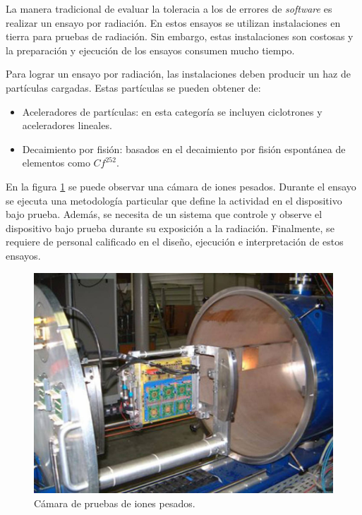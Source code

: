 La manera tradicional de evaluar la toleracia a los de errores de \emph{software} es realizar un ensayo por radiación.
En estos ensayos se utilizan instalaciones en tierra para pruebas de radiación.
Sin embargo, estas instalaciones son costosas y la preparación y ejecución de los ensayos consumen mucho tiempo.

Para lograr un ensayo por radiación, las instalaciones deben producir un haz de partículas cargadas.
Estas partículas se pueden obtener de:
\begin{itemize}
    \item Aceleradores de partículas: en esta categoría se incluyen ciclotrones y aceleradores lineales.
    \item Decaimiento por fisión: basados en el decaimiento por fisión espontánea de elementos como $Cf^{252}$.
\end{itemize}

En la figura \ref{fig:iones} se puede observar una cámara de iones pesados.
Durante el ensayo se ejecuta una metodología particular que define la actividad en el dispositivo bajo prueba.
Además, se necesita de un sistema que controle y observe el dispositivo bajo prueba durante su exposición a la radiación.
Finalmente, se requiere de personal calificado en el diseño, ejecución e interpretación de estos ensayos.

\begin{figure}[htbp]
	\centering
	\includegraphics[width=\textwidth]{./Figures/heavy_ion_latchup_tests_in_louvain_la_neuve.jpg}
    \caption{Cámara de pruebas de iones pesados\protect\footnotemark.}
	\label{fig:iones}
\end{figure}

